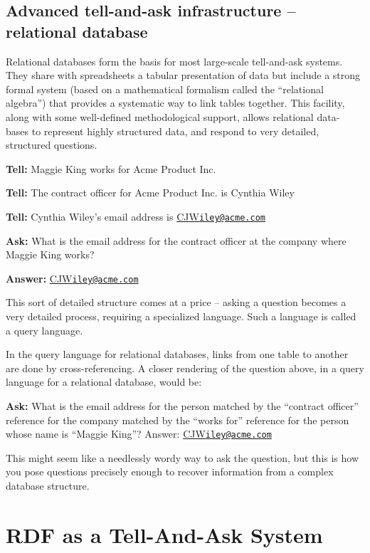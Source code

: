 \subsection{Advanced tell-and-ask infrastructure -- relational database}

Relational databases form the basis for most large-scale tell-and-ask
systems. They share with spreadsheets a tabular presentation of data but
include a strong formal system (based on a mathematical formalism called
the ``relational algebra'') that provides a systematic way to link
tables together. This facility, along with some well-defined
methodological support, allows relational data- bases to represent
highly structured data, and respond to very detailed, structured
questions.

\textbf{Tell:} Maggie King works for Acme Product Inc.

\textbf{Tell:} The contract officer for Acme Product Inc. is Cynthia Wiley

\textbf{Tell:} Cynthia Wiley's email address is
\href{mailto:CJWiley@acme.com}{CJW}\href{mailto:iley@acme.com}{\nolinkurl{iley@acme.com}}

\textbf{Ask:} What is the email address for the contract officer at the company
where Maggie King works?

\textbf{Answer:}
\href{mailto:CJWiley@acme.com}{CJW}\href{mailto:iley@acme.com}{\nolinkurl{iley@acme.com}}

This sort of detailed structure comes at a price -- asking a question
becomes a very detailed process, requiring a specialized language. Such
a language is called a query language.

In the query language for relational databases, links from one table to
another are done by cross-referencing.  A closer rendering of the
question above, in a query language for a relational database, would be:

\textbf{Ask:} What is the email address for the person matched by the ``contract
officer'' reference for the company matched by the ``works for''
reference for the person whose name is ``Maggie King''? Answer:
\href{mailto:CJWiley@acme.com}{CJW}\href{mailto:iley@acme.com}{\nolinkurl{iley@acme.com}}

This might seem like a needlessly wordy way to ask the question, but
this is how you pose questions precisely enough to recover information
from a complex database structure.

\section{RDF as a Tell-And-Ask System}

